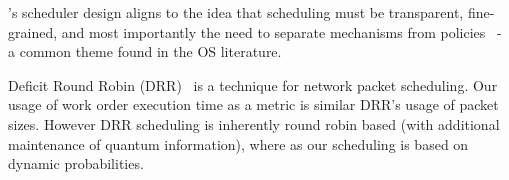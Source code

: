 
\sys{}'s scheduler design aligns to the idea that scheduling must be transparent, fine-grained, and most importantly the need to separate mechanisms from policies~\cite{LampsonS76} - a common theme found in the OS literature.

Deficit Round Robin (DRR)~\cite{shreedhar1996efficient} is a technique for network packet scheduling.
Our usage of work order execution time as a metric is similar DRR's usage of packet sizes. 
However DRR scheduling is inherently round robin based (with additional maintenance of quantum information), where as our scheduling is based on dynamic probabilities. 

